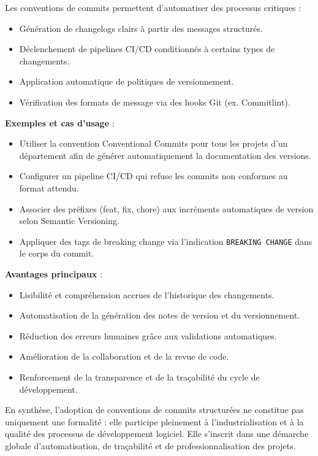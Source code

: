 Les conventions de commits permettent d’automatiser des processus critiques :
\begin{itemize}
	\item Génération de changelogs clairs à partir des messages structurés.
	\item Déclenchement de pipelines CI/CD conditionnés à certains types de changements.
	\item Application automatique de politiques de versionnement.
	\item Vérification des formats de message via des hooks Git (ex. Commitlint).
\end{itemize}

\textbf{Exemples et cas d’usage} :
\begin{itemize}
	\item Utiliser la convention Conventional Commits pour tous les projets d’un département afin de générer automatiquement la documentation des versions.
	\item Configurer un pipeline CI/CD qui refuse les commits non conformes au format attendu.
	\item Associer des préfixes (feat, fix, chore) aux incréments automatiques de version selon Semantic Versioning.
	\item Appliquer des tags de breaking change via l’indication \texttt{BREAKING CHANGE} dans le corps du commit.
\end{itemize}

\textbf{Avantages principaux} :
\begin{itemize}
	\item Lisibilité et compréhension accrues de l’historique des changements.
	\item Automatisation de la génération des notes de version et du versionnement.
	\item Réduction des erreurs humaines grâce aux validations automatiques.
	\item Amélioration de la collaboration et de la revue de code.
	\item Renforcement de la transparence et de la traçabilité du cycle de développement.
\end{itemize}

En synthèse, l’adoption de conventions de commits structurées ne constitue pas uniquement une formalité : elle participe pleinement à l’industrialisation et à la qualité des processus de développement logiciel. Elle s’inscrit dans une démarche globale d’automatisation, de traçabilité et de professionnalisation des projets.

